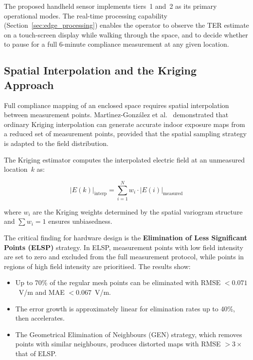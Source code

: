\documentclass[11pt,a4paper]{article}
\begin{document}
\noindent The proposed handheld sensor implements tiers~1 and~2 as its primary operational modes. The real-time processing capability (Section~\ref{sec:edge_processing}) enables the operator to observe the TER estimate on a touch-screen display while walking through the space, and to decide whether to pause for a full 6-minute compliance measurement at any given location.

\subsection{Spatial Interpolation and the Kriging Approach}

Full compliance mapping of an enclosed space requires spatial interpolation between measurement points. Mart{\'{\i}}nez-Gonz{\'a}lez et al.\ \cite{martinezgonzalez_2022} demonstrated that ordinary Kriging interpolation can generate accurate indoor exposure maps from a reduced set of measurement points, provided that the spatial sampling strategy is adapted to the field distribution.

The Kriging estimator computes the interpolated electric field at an unmeasured location~$k$ as:

\begin{equation}
    |E(k)|_{\text{interp}} = \sum_{i=1}^{N} w_i \cdot |E(i)|_{\text{measured}}
    \label{eq:kriging}
\end{equation}

\noindent where $w_i$ are the Kriging weights determined by the spatial variogram structure and $\sum w_i = 1$ ensures unbiasedness.

The critical finding for hardware design is the \textbf{Elimination of Less Significant Points (ELSP)} strategy. In ELSP, measurement points with low field intensity are set to zero and excluded from the full measurement protocol, while points in regions of high field intensity are prioritised. The results show:

\begin{itemize}
    \item Up to 70\% of the regular mesh points can be eliminated with RMSE $< 0.071$~V/m and MAE $< 0.067$~V/m.
    \item The error growth is approximately linear for elimination rates up to 40\%, then accelerates.
    \item The Geometrical Elimination of Neighbours (GEN) strategy, which removes points with similar neighbours, produces distorted maps with RMSE $> 3\times$ that of ELSP.
\end{itemize}
\end{document}
